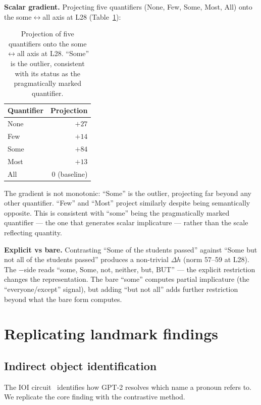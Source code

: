 \documentclass[11pt]{article}
\newcommand{\dhh}{\Delta h}
\begin{document}
\textbf{Scalar gradient.} Projecting five quantifiers (None, Few, Some, Most,
All) onto the some$\leftrightarrow$all axis at L28 (Table~\ref{tab:scalar-gradient}):

\begin{table}[htbp]
\centering
\small
\begin{tabular}{lr}
\toprule
Quantifier & Projection \\
\midrule
None & $+27$ \\
Few & $+14$ \\
Some & $+84$ \\
Most & $+13$ \\
All & 0 (baseline) \\
\bottomrule
\end{tabular}
\caption{Projection of five quantifiers onto the some$\leftrightarrow$all axis at L28. ``Some'' is the outlier, consistent with its status as the pragmatically marked quantifier.}
\label{tab:scalar-gradient}
\end{table}

The gradient is not monotonic: ``Some'' is the outlier, projecting far beyond
any other quantifier. ``Few'' and ``Most'' project similarly despite being
semantically opposite. This is consistent with ``some'' being the
pragmatically marked quantifier --- the one that generates scalar implicature
--- rather than the scale reflecting quantity.

\textbf{Explicit vs bare.} Contrasting ``Some of the students passed'' against
``Some but not all of the students passed'' produces a non-trivial $\dhh$ (norm
57--59 at L28). The $-$side reads ``some, Some, not, neither, but, BUT'' --- the
explicit restriction changes the representation. The bare ``some'' computes
partial implicature (the ``everyone/except'' signal), but adding ``but not all''
adds further restriction beyond what the bare form computes.

\section{Replicating landmark findings}

\subsection{Indirect object identification}

The IOI circuit~\citep{wang2023} identifies how GPT-2 resolves which name a
pronoun refers to. We replicate the core finding with the contrastive method.
\end{document}
